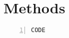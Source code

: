 \section{Methods}\label{methods}

\begin{Verbatim}[numbers=left,fontsize=\small]
  CODE
\end{Verbatim}


